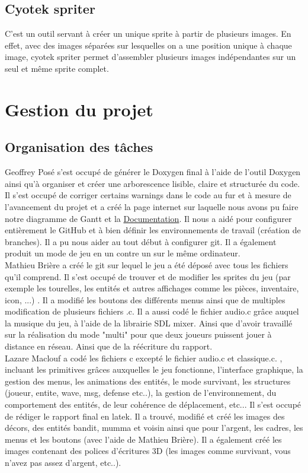 \documentclass[a4paper,11pt]{article}
\begin{document}
\subsection{Cyotek spriter}
C'est un outil servant à créer un unique sprite à partir de plusieurs images. En effet, avec des images séparées sur lesquelles on a une position unique à chaque image, cyotek spriter permet d'assembler plusieurs images indépendantes sur un seul et même sprite complet.\\ 

\section{Gestion du projet}
\subsection{Organisation des tâches}

Geoffrey Posé s'est occupé de générer le Doxygen final à l'aide de l'outil Doxygen ainsi qu'à organiser et créer une arborescence lisible, claire et structurée du code. Il s'est occupé de corriger certains warnings dans le code au fur et à mesure de l'avancement du projet et a créé la page internet sur laquelle nous avons pu faire notre diagramme de Gantt et la \href{https://mat7813.GitHub.io/Battle-ground/doc/html/index.html}{Documentation}. Il nous a aidé pour configurer entièrement le GitHub et à bien définir les environnements de travail (création de branches). Il a pu nous aider au tout début à configurer git. Il a également produit un mode de jeu en un contre un  sur le même ordinateur.\\ 

Mathieu Brière a créé le git sur lequel le jeu a été déposé avec tous les fichiers qu'il comprend. Il s'est occupé de trouver et de modifier les sprites du jeu (par exemple les tourelles, les entités et autres affichages comme les pièces, inventaire, icon, ...) . Il a modifié les boutons des différents menus ainsi que de multiples modification de plusieurs fichiers .c. Il a aussi codé le fichier audio.c grâce auquel la musique du jeu, à l'aide de la librairie SDL mixer. Ainsi que d'avoir travaillé sur la réalisation du mode "multi" pour que deux joueurs puissent jouer à distance en réseau. Ainsi que de la réécriture du rapport.\\

Lazare Maclouf a codé les fichiers c excepté le fichier audio.c et classique.c. , incluant les primitives grâces auxquelles le jeu fonctionne, l'interface graphique, la gestion des menus, les animations des entités, le mode survivant, les structures (joueur, entite, wave, msg, defense etc..), la gestion de l'environnement, du comportement des entités, de leur cohérence de déplacement, etc... Il s'est occupé de rédiger le rapport final en latek. Il a trouvé, modifié et créé les images des décors, des entités bandit, mumma et voisin ainsi que pour l'argent, les cadres, les menus et les boutons (avec l'aide de Mathieu Brière). Il a également créé les images contenant des polices d'écritures 3D (les images comme survivant, vous n'avez pas assez d'argent, etc..). \\
\end{document}
